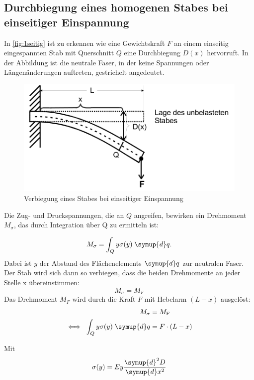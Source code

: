 \subsection{Durchbiegung eines homogenen Stabes bei einseitiger Einspannung}
In \autoref{fig:1seitig} ist zu erkennen wie eine Gewichtskraft $F$ an einem einseitig eingespannten Stab mit Querschnitt $Q$ eine Durchbiegung $D(x)$ hervorruft. In der Abbildung ist die neutrale Faser, in der keine Spannungen oder Längenänderungen auftreten, gestrichelt angedeutet.
\begin{figure}
	\centering
	\includegraphics{durchbiegung_einseitig.PNG}
	\caption{Verbiegung eines Stabes bei einseitiger Einspannung \cite{sample}}
	\label{fig:1seitig} 
\end{figure}
Die Zug- und Druckspannungen, die an $Q$ angreifen, bewirken ein Drehmoment $M_\sigma$, das durch Integration über Q zu ermitteln ist: 

\begin{equation}
    M_\sigma = \int_Q y \sigma(y) \; \symup{d}q.
	\label{eqn:2}
\end{equation}
Dabei ist $y$ der Abstand des Flächenelements $\symup{d}q$ zur neutralen Faser.
Der Stab wird sich dann so verbiegen, dass die beiden Drehmomente an jeder Stelle x übereinstimmen:
\begin{equation}
    M_\sigma = M_F
	\label{eqn:3}
\end{equation}
Das Drehmoment $M_F$ wird durch die Kraft $F$ mit Hebelarm $(L-x)$ ausgelöst:
\begin{align}
    M_\sigma &=M_\text{F}  \\
    \iff \; \int_Q y \sigma(y) \; \symup{d}q &= F \cdot (L - x)
	\label{eqn:4}
\end{align}

Mit
\begin{equation}
    \sigma(y) = E y \frac{ \symup{d}^{ 2 }D }{ \symup{d}x^{ 2 } }	
\end{equation}


